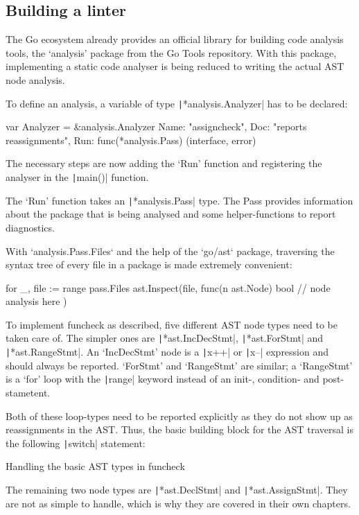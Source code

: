 \subsection{Building a linter}

The Go ecosystem already provides an official library for building code analysis tools,
the `analysis' package from the Go Tools repository\autocite{go-analysis}. With this package,
implementing a static code analyser is being reduced to writing the actual AST node analysis.

To define an analysis, a variable of type \texttt|*analysis.Analyzer| has to be declared:

\begin{gocode}
var Analyzer = &analysis.Analyzer{
	Name: "assigncheck",
	Doc:  "reports reassignments",
	Run:  func(*analysis.Pass) (interface{}, error)
}
\end{gocode}

The necessary steps are now adding the `Run' function and registering the analyser
in the \texttt|main()| function.

The `Run' function takes an \texttt|*analysis.Pass| type. The Pass provides
information about the package that is being analysed and some helper-functions to report
diagnostics.

With `analysis.Pass.Files` and the help of the `go/ast` package, traversing the syntax
tree of every file in a package is made extremely convenient:

\begin{gocode}
for _, file := range pass.Files {
	ast.Inspect(file, func(n ast.Node) bool {
		// node analysis here
	})
}
\end{gocode}

To implement funcheck as described, five different AST node types need to be
taken care of. The simpler ones are
\texttt|*ast.IncDecStmt|, \texttt|*ast.ForStmt| and \texttt|*ast.RangeStmt|.
An `IncDecStmt' node is a \texttt|x++| or \texttt|x--|
expression and should always be reported.
`ForStmt' and `RangeStmt' are similar; a `RangeStmt' is a `for' loop with the
\texttt|range| keyword instead of an init-, condition- and post-stametent.

Both of these loop-types need to be reported explicitly as they do not show up
as reassignments in the AST.
Thus, the basic building block for the AST traversal is the following \texttt|switch|
statement:
\begin{code}
	\caption{Handling the basic AST types in funcheck\autocite{funcheck-ast-types}}
\end{code}
The remaining two node types are \texttt|*ast.DeclStmt| and \texttt|*ast.AssignStmt|.
They are not as simple to handle, which is why they are covered in their own chapters.


